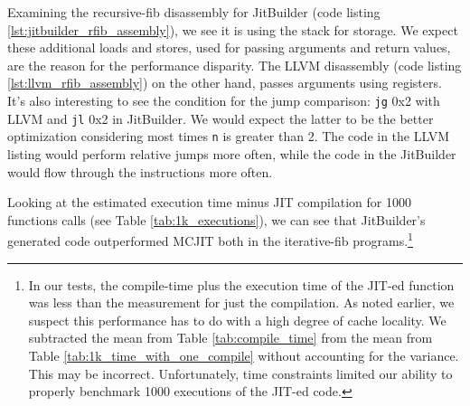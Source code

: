 Examining the recursive-fib disassembly for JitBuilder (code listing \ref{lst:jitbuilder_rfib_assembly}), we see it is using the stack for storage. We expect these additional loads and stores, used for passing arguments and return values, are the reason for the performance disparity.
The LLVM disassembly (code listing \ref{lst:llvm_rfib_assembly}) on the other hand, passes arguments using registers.
It's also interesting to see the condition for the jump comparison: \texttt{jg} 0x2 with LLVM and \texttt{jl} 0x2 in JitBuilder. 
We would expect the latter to be the better optimization considering most times \texttt{n} is greater than 2.
The code in the LLVM listing would perform relative jumps more often, while the code in the JitBuilder would flow through the instructions more often.

Looking at the estimated execution time minus JIT compilation for 1000 functions calls (see Table \ref{tab:1k_executions}), we can see that JitBuilder's generated code outperformed MCJIT both in the iterative-fib programs.\footnote{In our tests, the compile-time plus the execution time of the JIT-ed function was less than the measurement for just the compilation. As noted earlier, we suspect this performance has to do with a high degree of cache locality. We subtracted the mean from Table \ref{tab:compile_time} from the mean from Table \ref{tab:1k_time_with_one_compile} without accounting for the variance. This may be incorrect. Unfortunately, time constraints limited our ability to properly benchmark 1000 executions of the JIT-ed code.}


